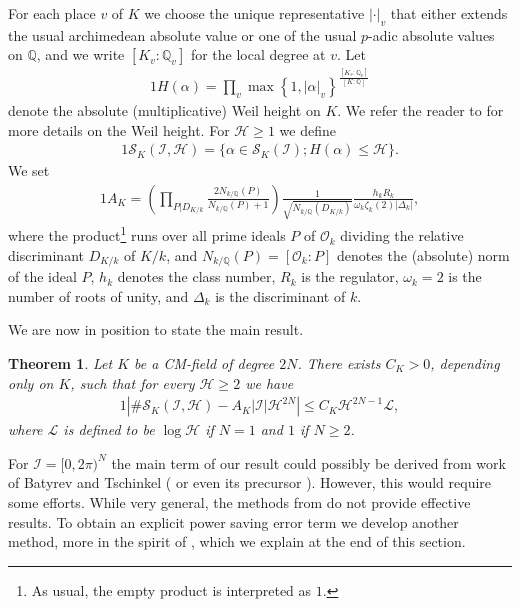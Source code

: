 \documentclass[11pt]{amsart}
\newtheorem{theorem}{Theorem}[section]
\numberwithin{equation}{eqncounter}
\def\IQ{\mathbb Q}
\def\IL{\mathcal{L}}
\def\H{\mathcal{H}}
\def\I{\mathcal{I}}
\def\Oseen{{\mathcal{O}}}
\def\Sc{\mathcal{S}}
\def\dis{D_{K/k}}
\def\conSK{A_K}
\begin{document}
For each place $v$ of $K$ we choose the unique representative $|\cdot |_v$ that either
extends the usual archimedean absolute value or one of the usual $p$-adic absolute values on $\IQ$,
and we write $[K_v:\IQ_v]$ for the local degree at $v$.
Let
\begin{alignat*}1
H(\alpha)=\prod_{v}\max\left\{1,|\alpha|_v\right\}^{\frac{[K_v:\IQ_v]}{[K:\IQ]}}
\end{alignat*}
denote the absolute (multiplicative) Weil height on $K$. We refer the reader to \cite[Section 1.5]{BG} for more details
on the Weil height.
For $\H\geq 1$ 
we define
\begin{alignat}1\label{set: SKIH}
\Sc_K(\I,\H)=\{\alpha\in \Sc_K(\I);  H(\alpha)\leq \H\}.
\end{alignat}
We set
\begin{alignat}1\label{def: SK}
\conSK=\left(\prod_{P|\dis}\frac{2N_{k/\IQ}(P)}{N_{k/\IQ}(P)+1}\right)\frac{1}{\sqrt{N_{k/\IQ}(\dis)}}\frac{h_kR_k}{\omega_k\zeta_k(2) |\Delta_k|},
\end{alignat}
where the product\footnote{As usual, the empty product is interpreted as $1$.} runs over all prime ideals $P$ of $\Oseen_k$ dividing the relative discriminant $\dis$  of $K/k$,  and
$N_{k/\IQ}(P)=[\Oseen_k:P]$ denotes the (absolute) norm of the ideal $P$,
$h_k$ denotes the class number, $R_k$ is the regulator,  $\omega_k=2$ is the number of roots of unity,  and $\Delta_k$ is the discriminant of $k$.


We are now in position to state the main result.
\begin{theorem}\label{thm: main}
Let $K$ be a CM-field of degree $2N$.
There exists  $C_K>0$, depending only on $K$, such that for every  $\H\geq 2$ we have
\begin{alignat}1\label{set: SKIH}
\left|\#\Sc_K(\I,\H)-\conSK|\I|\H^{2N}\right|\leq C_{K}\H^{2N-1}\IL,
\end{alignat}
where $\IL$ is defined to be $\log \H$ if $N=1$ and $1$ if $N\geq 2$.
\end{theorem}

For $\I=[0,2\pi)^N$ the main term of our result could possibly be derived from work of Batyrev and Tschinkel (\cite[Corollary 4.7]{BatyrevTschinkel1998} or even its precursor 
\cite{BatyrevTschinkel1995}). However, this would require some efforts. 
While very general, the methods from \cite{BatyrevTschinkel1998} do not provide effective results. To obtain an explicit power saving error term 
we develop another method, more in the spirit of \cite{MasserVaaler2}, which we explain at the end of this section.
\end{document}
